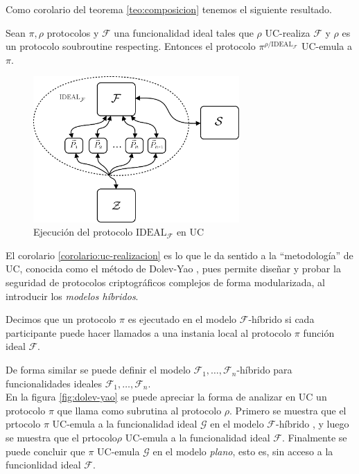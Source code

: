 Como corolario del teorema \ref{teo:composicion} tenemos el siguiente resultado.

\begin{corolario}
Sean $\pi, \rho$ protocolos y $\mathcal{F}$ una funcionalidad ideal tales que $\rho$ UC-realiza
$\mathcal{F}$ y $\rho$ es un protocolo soubroutine respecting. Entonces el protocolo
$\pi^{\rho/\mathrm{IDEAL}_\mathcal{F}}$ UC-emula a $\pi$.
\label{corolario:uc-realizacion}
\end{corolario}

\begin{figure}[hp]
    \centering
    \includegraphics[width=0.7\textwidth]{figs/mundo_ideal}
    \caption{Ejecución del protocolo $\mathrm{IDEAL}_\mathcal{F}$ en UC}
    \label{fig:mundo_ideal}
\end{figure}

El corolario \ref{corolario:uc-realizacion} es lo que le da sentido a la ``metodología'' de UC,
conocida como el método de Dolev-Yao \cite{dolev_yao}, pues permite diseñar y probar la seguridad
de protocolos criptográficos complejos de forma modularizada, al introducir los \textit{modelos
híbridos}.

\begin{definicion}
Decimos que un protocolo $\pi$ es ejecutado en el modelo $\mathcal{F}$-híbrido si cada participante puede
hacer llamados a una instania local al protocolo $\pi$ función ideal $\mathcal{F}$. 
\end{definicion}

De forma similar se puede definir el modelo $\mathcal{F}_1, \ldots, \mathcal{F}_n$-híbrido para
funcionalidades ideales $\mathcal{F}_1, \ldots, \mathcal{F}_n$.\\

En la figura \ref{fig:dolev-yao} se puede apreciar la forma de analizar en UC un protocolo $\pi$
que llama como subrutina al protocolo $\rho$. Primero se muestra que el prtocolo $\pi$ UC-emula a
la funcionalidad ideal $\mathcal{G}$ en el modelo $\mathcal{F}$-híbrido , y luego se muestra que el
prtocolo$\rho$ UC-emula a la funcionalidad ideal $\mathcal{F}$. Finalmente se puede concluir que
$\pi$ UC-emula $\mathcal{G}$ en el modelo \textit{plano}, esto es, sin acceso a la funcionlidad
ideal $\mathcal{F}$.

